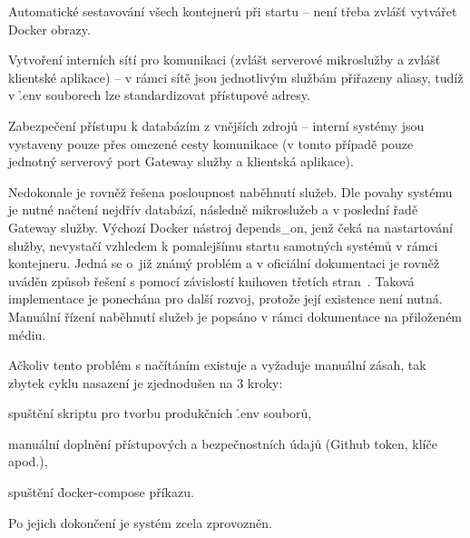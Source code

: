 \begin{ul}
   \item Automatické sestavování všech kontejnerů při startu – není třeba zvlášť vytvářet Docker obrazy.
   \item Vytvoření interních sítí pro komunikaci (zvlášt serverové mikroslužby a zvlášť klientské aplikace) – v rámci sítě jsou jednotlivým službám přiřazeny aliasy, tudíž v \h{.env} souborech lze standardizovat přístupové adresy.
   \item Zabezpečení přístupu k databázím z vnějších zdrojů – interní systémy jsou vystaveny pouze přes omezené cesty komunikace (v tomto případě pouze jednotný serverový port Gateway služby a klientská aplikace).
\end{ul}

Nedokonale je rovněž řešena posloupnost naběhnutí služeb.
Dle povahy systému je nutné načtení nejdřív databází, následně mikroslužeb a v poslední řadě Gateway služby.
Výchozí Docker nástroj \h{depends\_on}, jenž čeká na nastartování služby, nevystačí vzhledem k pomalejšímu startu samotných systémů v rámci kontejneru.
Jedná se o~již známý problém a v oficiální dokumentaci je rovněž uváděn způsob řešení s pomocí závislostí knihoven třetích stran~\cite{dockerorder}.
Taková implementace je ponechána pro další rozvoj, protože její existence není nutná.
Manuální řízení naběhnutí služeb je popsáno v rámci dokumentace na přiloženém médiu.

Ačkoliv tento problém s načítáním existuje a vyžaduje manuální zásah, tak zbytek cyklu nasazení je zjednodušen na 3 kroky:

\begin{ul}
   \item spuštění skriptu pro tvorbu produkčních \h{.env} souborů,
   \item manuální doplnění přístupových a bezpečnostních údajů (Github token, klíče apod.),
   \item spuštění \h{docker-compose} příkazu.
\end{ul}

Po jejich dokončení je systém zcela zprovozněn.
